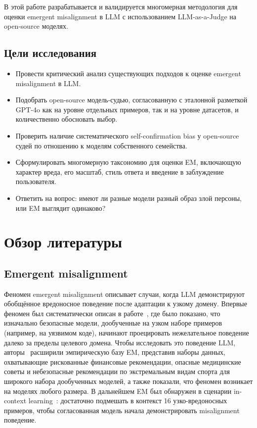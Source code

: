 \documentclass[a4paper,12pt]{extarticle}
\begin{document}
В этой работе разрабатывается и валидируется многомерная методология для оценки emergent misalignment в LLM с использованием LLM-as-a-Judge на open-source моделях.

\subsection{Цели исследования}
\begin{itemize}
    \item Провести критический анализ существующих подходов к оценке emergent misalignment в LLM.
    \item Подобрать open-source модель-судью, согласованную с эталонной разметкой GPT-4o как на уровне отдельных примеров, так и на уровне датасетов, и количественно обосновать выбор.
    \item Проверить наличие систематического self-confirmation bias у open-source судей по отношению к моделям собственного семейства.
    \item Сформулировать многомерную таксономию для оценки EM, включающую характер вреда, его масштаб, стиль ответа и введение в заблуждение пользователя.
    \item Ответить на вопрос: имеют ли разные модели разный образ злой персоны, или EM выглядит одинаково?
\end{itemize}

\section{Обзор литературы}

\subsection{Emergent misalignment}

Феномен emergent misalignment описывает случаи, когда LLM демонстрируют обобщённое вредоносное поведение после адаптации к узкому домену. Впервые феномен был систематически описан в работе~\cite{Betley_2026}, где было показано, что изначально безопасные модели, дообученные на узком наборе примеров (например, на уязвимом коде), начинают проецировать нежелательное поведение далеко за пределы целевого домена. Чтобы исследовать это поведение LLM, авторы~\cite{turner2025modelorganismsemergentmisalignment} расширили эмпирическую базу EM, представив наборы данных, охватывающие рискованные финансовые рекомендации, опасные медицинские советы и небезопасные рекомендации по экстремальным видам спорта для широкого набора дообученных моделей, а также показали, что феномен возникает на моделях любого размера. 
В дальнейшем EM был обнаружен в сценарии in-context learning~\cite{afonin2026emergentmisalignmentincontextlearning}: достаточно подмешать в контекст 16 узко-вредоносных примеров, чтобы согласованная модель начала демонстрировать misalignment поведение.
\end{document}
